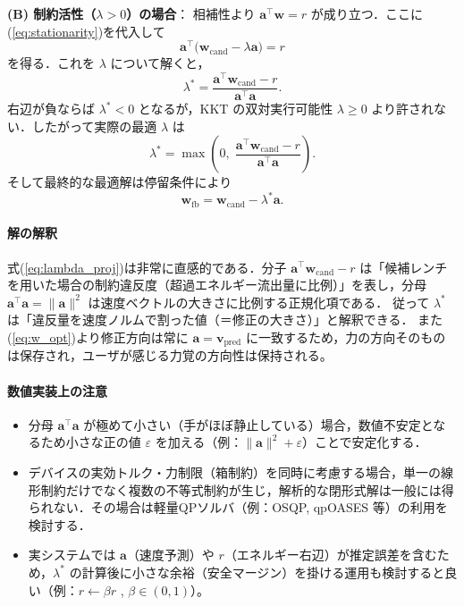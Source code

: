 \documentclass[uplatex]{jsarticle}
\begin{document}
\medskip\noindent
\textbf{(B) 制約活性（\(\lambda>0\)）の場合}：
相補性より \(\boldsymbol{a}^\top\boldsymbol{w}=r\) が成り立つ．ここに(\ref{eq:stationarity})を代入して
\[
\boldsymbol{a}^\top\big(\boldsymbol{w}_{\mathrm{cand}} - \lambda\boldsymbol{a}\big) = r
\]
を得る．これを \(\lambda\) について解くと，
\begin{equation}\label{eq:lambda_closed}
 \lambda^\ast = \frac{\boldsymbol{a}^\top\boldsymbol{w}_{\mathrm{cand}} - r}{\boldsymbol{a}^\top\boldsymbol{a}}.
\end{equation}
右辺が負ならば \(\lambda^\ast<0\) となるが，KKT の双対実行可能性 \(\lambda\ge 0\) より許されない．したがって実際の最適 \(\lambda\) は
\begin{equation}\label{eq:lambda_proj}
 \lambda^\ast = \max\!\left(0,\; \frac{\boldsymbol{a}^\top\boldsymbol{w}_{\mathrm{cand}} - r}{\boldsymbol{a}^\top\boldsymbol{a}} \right).
\end{equation}
そして最終的な最適解は停留条件により
\begin{equation}\label{eq:w_opt}
 \boldsymbol{w}_{\mathrm{fb}} = \boldsymbol{w}_{\mathrm{cand}} - \lambda^\ast \boldsymbol{a}.
\end{equation}

\paragraph{解の解釈}
式(\ref{eq:lambda_proj})は非常に直感的である．分子 \(\boldsymbol{a}^\top\boldsymbol{w}_{\mathrm{cand}} - r\) は「候補レンチを用いた場合の制約違反度（超過エネルギー流出量に比例）」を表し，分母 \(\boldsymbol{a}^\top\boldsymbol{a}=\|\boldsymbol{a}\|^2\) は速度ベクトルの大きさに比例する正規化項である．
従って \(\lambda^\ast\) は「違反量を速度ノルムで割った値（＝修正の大きさ）」と解釈できる．
また(\ref{eq:w_opt})より修正方向は常に \(\boldsymbol{a}=\boldsymbol{v}_{\mathrm{pred}}\) に一致するため，力の方向そのものは保存され，ユーザが感じる力覚の方向性は保持される。

\paragraph{数値実装上の注意}
\begin{itemize}
 \item 分母 \(\boldsymbol{a}^\top\boldsymbol{a}\) が極めて小さい（手がほぼ静止している）場合，数値不安定となるため小さな正の値 \(\varepsilon\) を加える（例：\(\|\boldsymbol{a}\|^2+\varepsilon\)）ことで安定化する．
 \item デバイスの実効トルク・力制限（箱制約）を同時に考慮する場合，単一の線形制約だけでなく複数の不等式制約が生じ，解析的な閉形式解は一般には得られない．その場合は軽量QPソルバ（例：OSQP, qpOASES 等）の利用を検討する．
 \item 実システムでは \(\boldsymbol{a}\)（速度予測）や \(r\)（エネルギー右辺）が推定誤差を含むため，\(\lambda^\ast\) の計算後に小さな余裕（安全マージン）を掛ける運用も検討すると良い（例：\(r \leftarrow \beta r\) , \(\beta\in(0,1)\)）。
\end{itemize}
\end{document}
